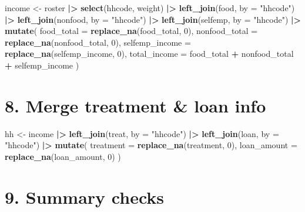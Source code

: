 \documentclass[
]{article}
\newenvironment{Shaded}{\begin{snugshade}}{\end{snugshade}}
\newcommand{\AttributeTok}[1]{\textcolor[rgb]{0.13,0.29,0.53}{#1}}
\newcommand{\DecValTok}[1]{\textcolor[rgb]{0.00,0.00,0.81}{#1}}
\newcommand{\FunctionTok}[1]{\textcolor[rgb]{0.13,0.29,0.53}{\textbf{#1}}}
\newcommand{\NormalTok}[1]{#1}
\newcommand{\OtherTok}[1]{\textcolor[rgb]{0.56,0.35,0.01}{#1}}
\newcommand{\SpecialCharTok}[1]{\textcolor[rgb]{0.81,0.36,0.00}{\textbf{#1}}}
\newcommand{\StringTok}[1]{\textcolor[rgb]{0.31,0.60,0.02}{#1}}
\begin{document}
\begin{Shaded}
\begin{Highlighting}[]
\NormalTok{income }\OtherTok{\textless{}{-}}\NormalTok{ roster }\SpecialCharTok{|\textgreater{}}
  \FunctionTok{select}\NormalTok{(hhcode, weight) }\SpecialCharTok{|\textgreater{}}
  \FunctionTok{left\_join}\NormalTok{(food, }\AttributeTok{by =} \StringTok{"hhcode"}\NormalTok{) }\SpecialCharTok{|\textgreater{}}
  \FunctionTok{left\_join}\NormalTok{(nonfood, }\AttributeTok{by =} \StringTok{"hhcode"}\NormalTok{) }\SpecialCharTok{|\textgreater{}}
  \FunctionTok{left\_join}\NormalTok{(selfemp, }\AttributeTok{by =} \StringTok{"hhcode"}\NormalTok{) }\SpecialCharTok{|\textgreater{}}
  \FunctionTok{mutate}\NormalTok{(}
    \AttributeTok{food\_total     =} \FunctionTok{replace\_na}\NormalTok{(food\_total, }\DecValTok{0}\NormalTok{),}
    \AttributeTok{nonfood\_total  =} \FunctionTok{replace\_na}\NormalTok{(nonfood\_total, }\DecValTok{0}\NormalTok{),}
    \AttributeTok{selfemp\_income =} \FunctionTok{replace\_na}\NormalTok{(selfemp\_income, }\DecValTok{0}\NormalTok{),}
    \AttributeTok{total\_income   =}\NormalTok{ food\_total }\SpecialCharTok{+}\NormalTok{ nonfood\_total }\SpecialCharTok{+}\NormalTok{ selfemp\_income}
\NormalTok{  )}
\end{Highlighting}
\end{Shaded}

\section{8. Merge treatment \& loan
info}\label{merge-treatment-loan-info}

\begin{Shaded}
\begin{Highlighting}[]
\NormalTok{hh }\OtherTok{\textless{}{-}}\NormalTok{ income }\SpecialCharTok{|\textgreater{}}
  \FunctionTok{left\_join}\NormalTok{(treat, }\AttributeTok{by =} \StringTok{"hhcode"}\NormalTok{) }\SpecialCharTok{|\textgreater{}}
  \FunctionTok{left\_join}\NormalTok{(loan, }\AttributeTok{by =} \StringTok{"hhcode"}\NormalTok{) }\SpecialCharTok{|\textgreater{}}
  \FunctionTok{mutate}\NormalTok{(}
    \AttributeTok{treatment   =} \FunctionTok{replace\_na}\NormalTok{(treatment, }\DecValTok{0}\NormalTok{),}
    \AttributeTok{loan\_amount =} \FunctionTok{replace\_na}\NormalTok{(loan\_amount, }\DecValTok{0}\NormalTok{)}
\NormalTok{  )}
\end{Highlighting}
\end{Shaded}

\section{9. Summary checks}\label{summary-checks}
\end{document}

